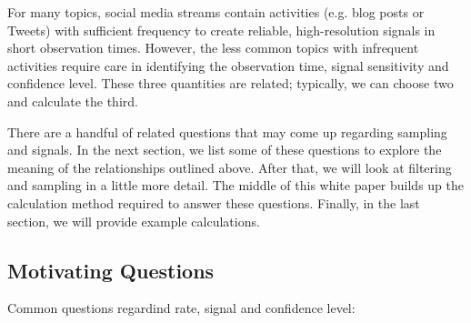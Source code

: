 \documentclass{article}
\begin{document}
%
%
%

For many topics, social media streams contain activities (e.g. blog posts or Tweets) with sufficient frequency to create reliable, high-resolution signals in short observation times.  However, the less common topics with infrequent activities require care in identifying the observation time, signal sensitivity and confidence level. These three quantities are related; typically, we can choose two and calculate the third.

There are a handful of related questions that may come up regarding sampling and signals.  In the next section, we list some of these questions to explore the meaning of the relationships outlined above. After that, we will look at filtering and sampling in a little more detail.  The middle of this white paper builds up the calculation method required to answer these questions. Finally, in the last section, we will provide example calculations.

\subsection{Motivating Questions} 

Common questions regardind rate, signal and confidence level:
\end{document}
